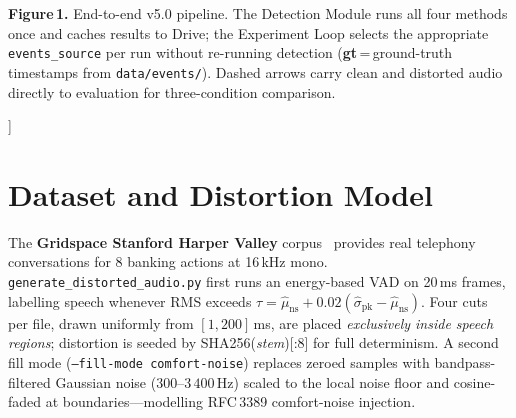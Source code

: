 \documentclass[9pt,twocolumn]{article}
\begin{document}
{\begin{center}
\end{center}
{\scriptsize\textbf{Figure\,1.}
End-to-end v5.0 pipeline.
The Detection Module runs all four methods once and caches results to Drive;
the Experiment Loop selects the appropriate \texttt{events\_source} per run
without re-running detection (\textbf{gt}\,=\,ground-truth timestamps from
\texttt{data/events/}).
Dashed arrows carry clean and distorted audio directly to evaluation
for three-condition comparison.}
\vspace{4pt}
}]%

\section{Dataset and Distortion Model}
\label{sec:distortion}

The \textbf{Gridspace Stanford Harper Valley} corpus~\cite{harpervalley}
provides real telephony conversations for 8 banking actions at 16\,kHz mono.
\texttt{generate\_distorted\_audio.py} first runs an energy-based VAD on 20\,ms
frames, labelling speech whenever RMS exceeds
$\tau{=}\hat\mu_\mathrm{ns}+0.02(\hat\sigma_\mathrm{pk}{-}\hat\mu_\mathrm{ns})$.
Four cuts per file, drawn uniformly from $[1,200]$\,ms, are placed
\emph{exclusively inside speech regions}; distortion is seeded by
SHA256(\textit{stem})[:8] for full determinism.
A second fill mode (\texttt{--fill-mode\,comfort-noise}) replaces zeroed
samples with bandpass-filtered Gaussian noise ($300$--$3\,400$\,Hz) scaled to
the local noise floor and cosine-faded at boundaries---modelling RFC\,3389
comfort-noise injection.
\end{document}
